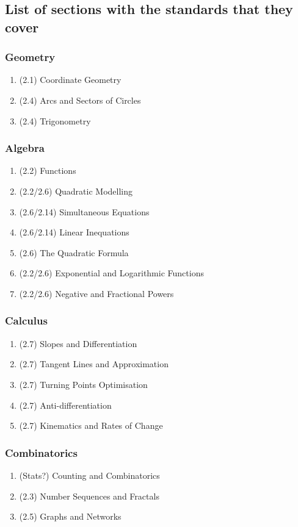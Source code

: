 \subsection*{List of sections with the standards that they cover}
\subsubsection*{Geometry}
\begin{enumerate}
  \item (2.1) Coordinate Geometry
  \item (2.4) Arcs and Sectors of Circles
  \item (2.4) Trigonometry
\end{enumerate}

\subsubsection*{Algebra}
\begin{enumerate}[resume]
  \item (2.2) Functions
  \item (2.2/2.6) Quadratic Modelling
  \item (2.6/2.14) Simultaneous Equations
  \item (2.6/2.14) Linear Inequations
  \item (2.6) The Quadratic Formula
  \item (2.2/2.6) Exponential and Logarithmic Functions
  \item (2.2/2.6) Negative and Fractional Powers
\end{enumerate}

\subsubsection*{Calculus}
\begin{enumerate}[resume]
  \item (2.7) Slopes and Differentiation
  \item (2.7) Tangent Lines and Approximation
  \item (2.7) Turning Points Optimisation
  \item (2.7) Anti-differentiation
  \item (2.7) Kinematics and Rates of Change
\end{enumerate}

\subsubsection*{Combinatorics}
\begin{enumerate}[resume]
  \item (Stats?) Counting and Combinatorics
  \item (2.3) Number Sequences and Fractals
  \item (2.5) Graphs and Networks
\end{enumerate}

